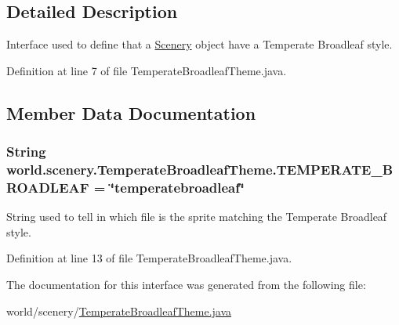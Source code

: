 \subsection{Detailed Description}
Interface used to define that a \hyperlink{a00024}{Scenery} object have a Temperate Broadleaf style. 

Definition at line 7 of file Temperate\-Broadleaf\-Theme.\-java.



\subsection{Member Data Documentation}
\hypertarget{a00030_a9e9253b684231327dd6ddeca5768033e}{
\subsubsection[{T\-E\-M\-P\-E\-R\-A\-T\-E\-\_\-\-B\-R\-O\-A\-D\-L\-E\-A\-F}]{\setlength{\rightskip}{0pt plus 5cm}String world.\-scenery.\-Temperate\-Broadleaf\-Theme.\-T\-E\-M\-P\-E\-R\-A\-T\-E\-\_\-\-B\-R\-O\-A\-D\-L\-E\-A\-F = \char`\"{}temperatebroadleaf\char`\"{}\hspace{0.3cm}{\ttfamily [static]}}}\label{a00030_a9e9253b684231327dd6ddeca5768033e}


String used to tell in which file is the sprite matching the Temperate Broadleaf style. 



Definition at line 13 of file Temperate\-Broadleaf\-Theme.\-java.



The documentation for this interface was generated from the following file\-:\begin{DoxyCompactItemize}
\item 
world/scenery/\hyperlink{a00075}{Temperate\-Broadleaf\-Theme.\-java}\end{DoxyCompactItemize}
